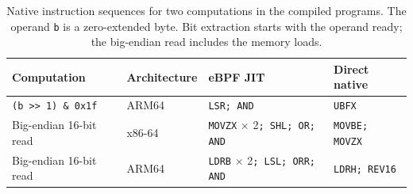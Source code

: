 \begin{table}[t]
\centering
\small
\caption{Native instruction sequences for two computations in the compiled programs. The operand \texttt{b} is a zero-extended byte. Bit extraction starts with the operand ready; the big-endian read includes the memory loads.}
\label{tab:isa-gap}
\begin{tabular}{@{}llll@{}}
\toprule
\textbf{Computation} & \textbf{Architecture} & \textbf{eBPF JIT} & \textbf{Direct native} \\
\midrule
\texttt{(b >{}> 1) \& 0x1f} & ARM64 & \texttt{LSR; AND} & \texttt{UBFX} \\
Big-endian 16-bit read & x86-64 & \texttt{MOVZX} $\times$ 2\texttt{; SHL; OR; AND} & \texttt{MOVBE; MOVZX} \\
Big-endian 16-bit read & ARM64 & \texttt{LDRB} $\times$ 2\texttt{; LSL; ORR; AND} & \texttt{LDRH; REV16} \\
\bottomrule
\end{tabular}
\end{table}

